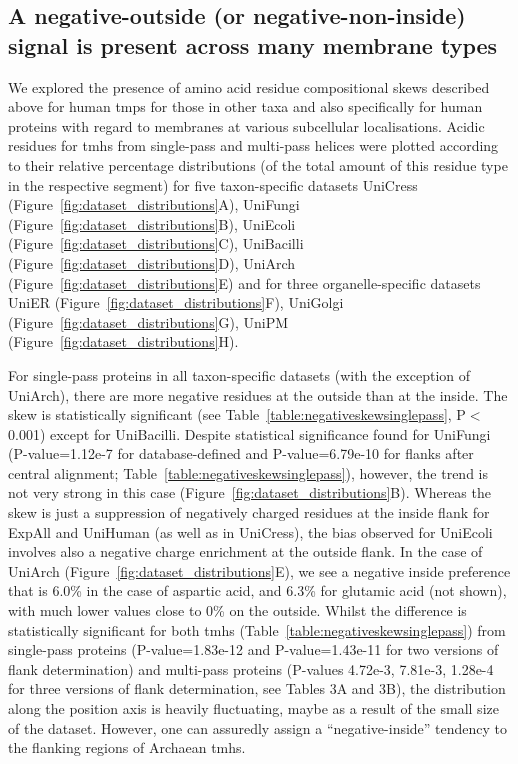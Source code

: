 \subsection{A negative-outside (or negative-non-inside) signal is present across many membrane types}

We explored the presence of amino acid residue compositional skews described above for human \gls{tmp}s for those in other taxa and also specifically for human proteins with regard to membranes at various subcellular localisations.
Acidic residues for \gls{tmh}s from single-pass and multi-pass helices were plotted according to their relative percentage distributions (of the total amount of this residue type in the respective segment) for five taxon-specific datasets UniCress (Figure~\ref{fig:dataset_distributions}A), UniFungi (Figure~\ref{fig:dataset_distributions}B), UniEcoli (Figure~\ref{fig:dataset_distributions}C), UniBacilli (Figure~\ref{fig:dataset_distributions}D), UniArch (Figure~\ref{fig:dataset_distributions}E) and for three organelle-specific datasets UniER (Figure~\ref{fig:dataset_distributions}F), UniGolgi (Figure~\ref{fig:dataset_distributions}G), UniPM (Figure~\ref{fig:dataset_distributions}H).

For single-pass proteins in all taxon-specific datasets (with the exception of UniArch), there are more negative residues at the outside than at the inside.
The skew is statistically significant (see Table~\ref{table:negativeskewsinglepass}, P$<$0.001) except for UniBacilli.
Despite statistical significance found for UniFungi (P-value=1.12e-7 for database-defined and P-value=6.79e-10 for flanks after central alignment; Table~\ref{table:negativeskewsinglepass}), however, the trend is not very strong in this case (Figure~\ref{fig:dataset_distributions}B).
Whereas the skew is just a suppression of negatively charged residues at the inside flank for ExpAll and UniHuman (as well as in UniCress), the bias observed for UniEcoli involves also a negative charge enrichment at the outside flank.
In the case of UniArch (Figure~\ref{fig:dataset_distributions}E), we see a negative inside preference that is 6.0\% in the case of aspartic acid, and 6.3\% for glutamic acid (not shown), with much lower values close to 0\% on the outside.
Whilst the difference is statistically significant for both \gls{tmh}s (Table~\ref{table:negativeskewsinglepass}) from single-pass proteins (P-value=1.83e-12 and P-value=1.43e-11 for two versions of flank determination) and multi-pass proteins (P-values 4.72e-3, 7.81e-3, 1.28e-4 for three versions of flank determination, see Tables 3A and 3B), the distribution along the position axis is heavily fluctuating, maybe as a result of the small size of the dataset.
However, one can assuredly assign a ``negative-inside'' tendency to the flanking regions of Archaean \gls{tmh}s.

